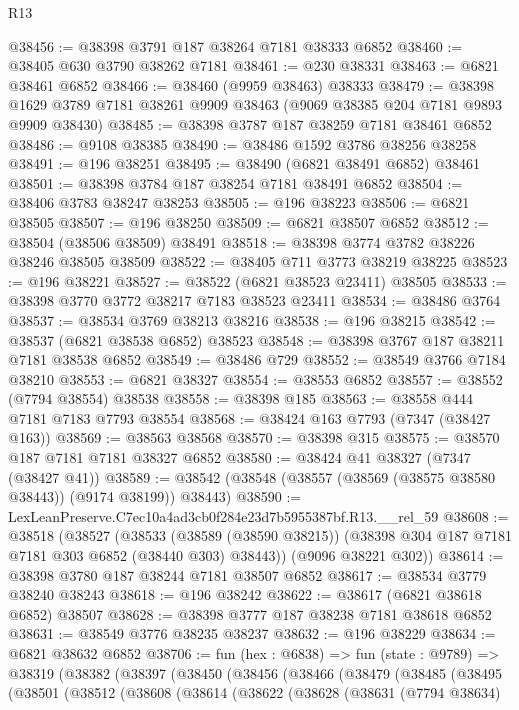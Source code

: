 \begin{lexlean}{R13}
\begin{coremodule}
@38456 := @38398 @3791 @187 @38264 @7181 @38333 @6852
@38460 := @38405 @630 @3790 @38262 @7181
@38461 := @230 @38331
@38463 := @6821 @38461 @6852
@38466 := @38460 (@9959 @38463) @38333
@38479 := @38398 @1629 @3789 @7181 @38261 @9909 @38463 (@9069 @38385 @204 @7181 @9893 @9909 @38430)
@38485 := @38398 @3787 @187 @38259 @7181 @38461 @6852
@38486 := @9108 @38385
@38490 := @38486 @1592 @3786 @38256 @38258
@38491 := @196 @38251
@38495 := @38490 (@6821 @38491 @6852) @38461
@38501 := @38398 @3784 @187 @38254 @7181 @38491 @6852
@38504 := @38406 @3783 @38247 @38253
@38505 := @196 @38223
@38506 := @6821 @38505
@38507 := @196 @38250
@38509 := @6821 @38507 @6852
@38512 := @38504 (@38506 @38509) @38491
@38518 := @38398 @3774 @3782 @38226 @38246 @38505 @38509
@38522 := @38405 @711 @3773 @38219 @38225
@38523 := @196 @38221
@38527 := @38522 (@6821 @38523 @23411) @38505
@38533 := @38398 @3770 @3772 @38217 @7183 @38523 @23411
@38534 := @38486 @3764
@38537 := @38534 @3769 @38213 @38216
@38538 := @196 @38215
@38542 := @38537 (@6821 @38538 @6852) @38523
@38548 := @38398 @3767 @187 @38211 @7181 @38538 @6852
@38549 := @38486 @729
@38552 := @38549 @3766 @7184 @38210
@38553 := @6821 @38327
@38554 := @38553 @6852
@38557 := @38552 (@7794 @38554) @38538
@38558 := @38398 @185
@38563 := @38558 @444 @7181 @7183 @7793 @38554
@38568 := @38424 @163 @7793 (@7347 (@38427 @163))
@38569 := @38563 @38568
@38570 := @38398 @315
@38575 := @38570 @187 @7181 @7181 @38327 @6852
@38580 := @38424 @41 @38327 (@7347 (@38427 @41))
@38589 := @38542 (@38548 (@38557 (@38569 (@38575 @38580 @38443)) (@9174 @38199)) @38443)
@38590 := LexLeanPreserve.C7ec10a4ad3cb0f284e23d7b5955387bf.R13.__rel_59
@38608 := @38518
    (@38527
      (@38533
        (@38589 (@38590 @38215))
        (@38398 @304 @187 @7181 @7181 @303 @6852 (@38440 @303) @38443))
      (@9096 @38221 @302))
@38614 := @38398 @3780 @187 @38244 @7181 @38507 @6852
@38617 := @38534 @3779 @38240 @38243
@38618 := @196 @38242
@38622 := @38617 (@6821 @38618 @6852) @38507
@38628 := @38398 @3777 @187 @38238 @7181 @38618 @6852
@38631 := @38549 @3776 @38235 @38237
@38632 := @196 @38229
@38634 := @6821 @38632 @6852
@38706 := fun (hex : @6838) =>
  fun (state : @9789) =>
  @38319
    (@38382
      (@38397
        (@38450
          (@38456
            (@38466
              (@38479
                (@38485
                  (@38495
                    (@38501
                      (@38512
                        (@38608
                          (@38614
                            (@38622
                              (@38628
                                (@38631
                                  (@7794 @38634)

\end{coremodule}
\end{lexlean}
